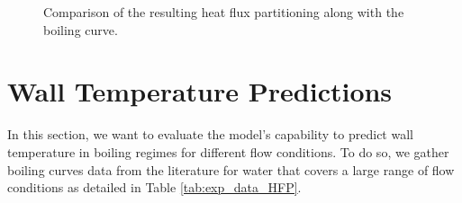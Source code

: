 \begin{figure}[!h]
\caption{Comparison of the resulting heat flux partitioning along with the boiling curve.}
\label{fig:fullkoss_hfp}
\end{figure}


\npar

\clearpage

\section{Wall Temperature Predictions}
\label{sec:hfp_valid_DTw}

In this section, we want to evaluate the model's capability to predict wall temperature in boiling regimes for different flow conditions. To do so, we gather boiling curves data from the literature for water that covers a large range of flow conditions as detailed in Table \ref{tab:exp_data_HFP}.



